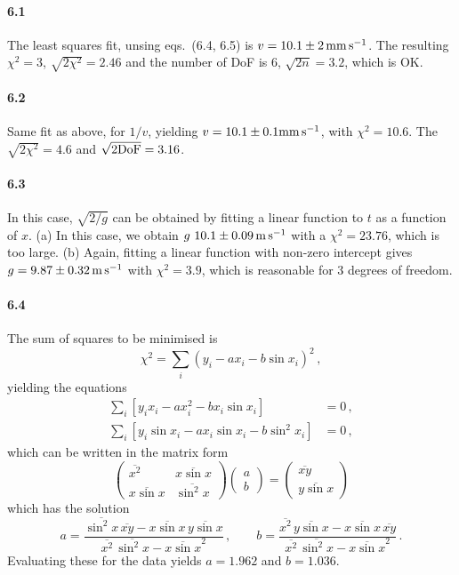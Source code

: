 \documentclass[a4paper,12pt]{article}
\begin{document}
\paragraph{6.1} The least squares fit, unsing eqs.\ (6.4, 6.5) is $v=10.1\pm 2\,{\rm mm\,s}^{-1}$. The resulting $\chi^2=3$, $\sqrt{2\chi^2}=2.46$ and the number of DoF is 6, $\sqrt{2n}=3.2$, which is OK.

\paragraph{6.2} Same fit as above, for $1/v$, yielding $v=10.1\pm 0.1 {\rm mm\,s}^{-1}$, with $\chi^2=10.6$. The $\sqrt{2\chi^2}=4.6$ and $\sqrt{2{\rm DoF}} = 3.16$.

\paragraph{6.3} In this case, $\sqrt{2/g}$ can be obtained by fitting a linear function to $t$ as a function of $x$. (a) In this case, we obtain $g \ 10.1\pm 0.09\,{\rm m\,s}^{-1}$ with a $\chi^2=23.76$, which is too large. (b) Again, fitting a linear function with non-zero intercept gives $g = 9.87 \pm 0.32\, {\rm m\, s}^{-1}$ with $\chi^2= 3.9$, which is reasonable for 3 degrees of freedom.

\paragraph{6.4} The sum of squares to be minimised is
\[
 \chi^2 = \sum_i (y_i - a x_i - b \sin x_i)^2\,,
\]
yielding the equations
\[
 \begin{aligned}
  \sum_i \left[ y_i x_i - a x_i^2 - b x_i \sin x_i\right] &= 0\,,\\
  \sum_i \left[ y_i \sin x_i - a x_i \sin x_i - b \sin^2 x_i \right] &= 0\,,
 \end{aligned}
\]
which can be written in the matrix form
\[
 \begin{pmatrix} \overline{x^2} & \overline{x\sin x} \\
  \overline{x\sin x} & \overline{\sin^2 x}
 \end{pmatrix}
 \begin{pmatrix} a \\ b \end{pmatrix}
 =
 \begin{pmatrix}
  \overline{x y} \\ \overline{y\sin x}
 \end{pmatrix}
\]
which has the solution
\[
 a = \frac{\overline{\sin^2 x}\,\overline{x y} - \overline{x\sin x}\,\overline{y\sin x}}{\overline{x^2}\,\overline{\sin^2 x} - \overline{x\sin x}^2}\,,\quad\quad
 b = \frac{\overline{x^2}\,\overline{y\sin x} - \overline{x\sin x}\,\overline{x y}}{\overline{x^2}\,\overline{\sin^2 x} - \overline{x\sin x}^2}\,.
\]
Evaluating these for the data yields $a = 1.962$ and $b = 1.036$.
\end{document}
